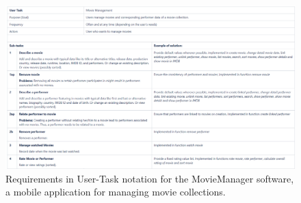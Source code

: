 \newpage
{}
\begin{landscape}

\begin{figure}
\centering
\includegraphics[scale=0.57]{../images/MovieManager.png} 
\caption{Requirements in User-Task notation for the MovieManager software, a mobile application for managing movie collections.}
\label{fig:mm}
\end{figure}

\end{landscape}
\restoregeometry




